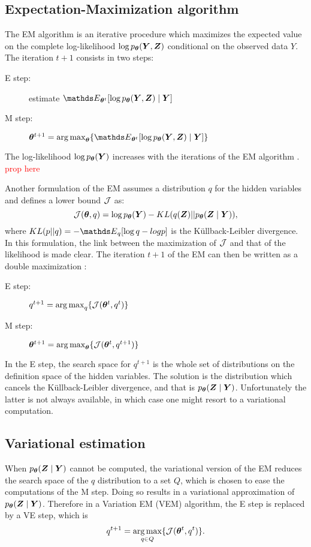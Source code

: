  \subsection{Expectation-Maximization algorithm}
 The EM algorithm is an iterative procedure which maximizes the expected value on  the complete log-likelihood $\log p_{\boldsymbol{\theta}} ({\boldsymbol{Y}}, {\boldsymbol{Z}})$ conditional on the observed data $Y$. The iteration $t+1$ consists in two steps:
 \begin{description}
 \item [E step:] estimate $\Esp_{\thetab^t}[\log p_\thetab (\Ybf, \Zbf)\mid \Ybf]$
 \item [M step:] $\thetab^{t+1} = \argmax_\thetab \{ \Esp_{\thetab^t}[\log p_\thetab (\Ybf, \Zbf)\mid \Ybf]\}$
 \end{description} 
 The  log-likelihood $\log p_{{\boldsymbol{\theta}}} ({\boldsymbol{Y}})$ increases with the iterations of the EM algorithm \citep{DLR77}. \\
 \textcolor{red}{prop here}
 
 Another formulation of the EM assumes a distribution $q$ for the hidden variables \citep{NH98} and defines a  lower bound ${\mathcal{J}}$ as:
 $${\mathcal{J}}({\boldsymbol{\theta}}, q) = \log p_{\boldsymbol{\theta}} ({\boldsymbol{Y}}) - KL(q({\boldsymbol{Z}}) || p_{\boldsymbol{\theta}}({\boldsymbol{Z}}\mid{\boldsymbol{Y}})),$$
 where $KL(p||q) = -\Esp_q[\log q - log p]$ is the Küllback-Leibler divergence. In this formulation, the link between the maximization of ${\mathcal{J}}$ and that of the likelihood is made clear. The iteration $t+1$ of the EM can then be written as a double maximization :
  \begin{description}
 \item [E step:]  $q^{t+1}=\operatorname*{arg\,max}_q \{ {\mathcal{J}}({\boldsymbol{\theta}}^t, q^t)\}$
 \item [M step:] ${\boldsymbol{\theta}}^{t+1} = \operatorname*{arg\,max}_{\boldsymbol{\theta}} \{ {\mathcal{J}}({\boldsymbol{\theta}}^t, q^{t+1})\}$
 \end{description} 
 
In the E step, the search space for $q^{t+1}$ is the whole set of distributions on the definition space of the hidden variables. The solution is the distribution which cancels the Küllback-Leibler divergence, and that is $p_{\boldsymbol{\theta}}({\boldsymbol{Z}}\mid{\boldsymbol{Y}})$. Unfortunately the latter is not always available, in which case one might resort to a variational computation.
 

 \subsection{Variational estimation}
 When $p_{\boldsymbol{\theta}}({\boldsymbol{Z}}\mid{\boldsymbol{Y}})$ cannot be computed, the variational version of the EM reduces the search space of the $q$ distribution to a set $Q$, which is chosen to ease the computations of the M step. Doing so results in a variational approximation of $p_{\boldsymbol{\theta}}({\boldsymbol{Z}}\mid{\boldsymbol{Y}})$. Therefore in a  Variation EM (VEM) algorithm, the E step is replaced by a VE step, which is  
 $$q^{t+1}=\operatorname*{arg\,max}_{q\in Q} \{ {\mathcal{J}}({\boldsymbol{\theta}}^t, q^t)\}.$$
 
